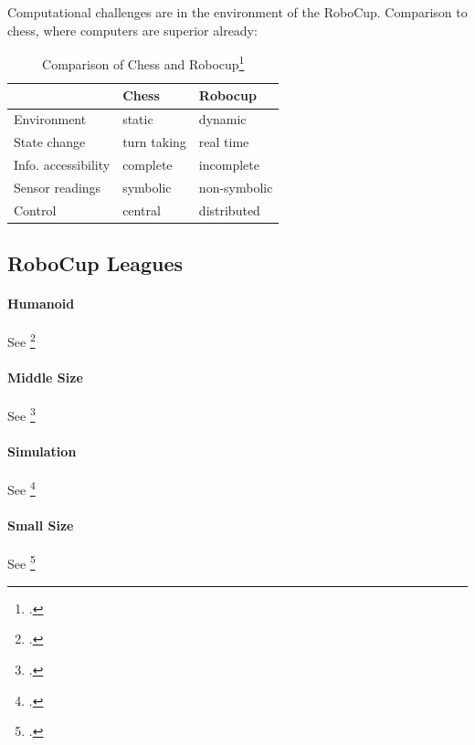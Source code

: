 Computational challenges are in the environment of the RoboCup.
Comparison to chess, where computers are superior already:

\begin{table}[htbp]
\centering
\begin{savenotes}
\begin{tabular*}{0.7\textwidth}{p{} p{} p{}}
\toprule
                    &\textbf{Chess} & \textbf{Robocup} \\
\midrule 
Environment         & static		& dynamic \\
State change        & turn taking   & real time \\
Info. accessibility & complete      & incomplete \\
Sensor readings     & symbolic      & non-symbolic \\
Control             & central       & distributed \\
\bottomrule 
\end{tabular*}
  \caption[Comparison of Chess and Robocup]{Comparison of Chess and Robocup\footcite[][]{robo_objectives}}
  \label{tab:chess_comparison}
\end{savenotes}
\end{table}

\subsection{RoboCup Leagues \label{sec:robo-leagues}}


\paragraph{Humanoid} See \footcite[Cf.][]{robo_humanoid_wiki}
 
\paragraph{Middle Size} See \footcite[Cf.][]{robo_ms_wiki}
 
\paragraph{Simulation} See \footcite[Cf.][]{robo_simu_wiki}
 
\paragraph{Small Size} See \footcite[Cf.][]{robo_ssl_wiki}
 
